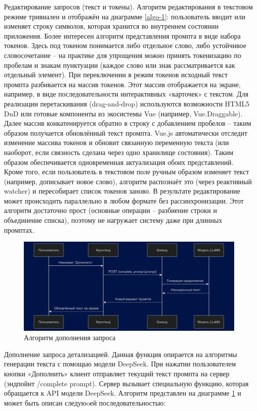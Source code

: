 Редактирование запросов (текст и токены). Алгоритм редактирования в текстовом режиме тривиален и отображён на диаграмме \ref{algo-1}: пользователь вводит или изменяет строку символов, которая хранится во внутреннем состоянии приложения. Более интересен алгоритм представления промпта в виде набора токенов. Здесь под токеном понимается либо отдельное слово, либо устойчивое словосочетание – на практике для упрощения можно принять токенизацию по пробелам и знакам пунктуации (каждое слово или знак рассматривается как отдельный элемент). При переключении в режим токенов исходный текст промпта разбивается на массив токенов. Этот массив отображается на экране, например, в виде последовательности интерактивных «карточек» с текстом. Для реализации перетаскивания (drag-and-drop) используются возможности HTML5 DnD или готовые компоненты из экосистемы Vue (например, Vue.Draggable). Далее массив конкатенируется обратно в строку с добавлением пробелов – таким образом получается обновлённый текст промпта. Vue.js автоматически отследит изменение массива токенов и обновит связанную переменную текста (или наоборот, если связность сделана через одно хранилище состояния). Таким образом обеспечивается одновременная актуализация обоих представлений. Кроме того, если пользователь в текстовом поле ручным образом изменяет текст (например, дописывает новое слово), алгоритм распознаёт это (через реактивный watcher) и пересобирает список токенов заново. В результате редактирование может происходить параллельно в любом формате без рассинхронизации. Этот алгоритм достаточно прост (основные операции – разбиение строки и объединение списка), поэтому не нагружает систему даже при длинных промптах.
\begin{figure}[htbp]
    \centering
    \includegraphics[width=1\textwidth]{picture/diploma-inter-algo-2.png}
    \caption{Алгоритм дополнения запроса}
    \label{algo-2}
\end{figure}
Дополнение запроса детализацией. Данная функция опирается на алгоритмы генерации текста с помощью модели DeepSeek. При нажатии пользователем кнопки «Дополнить» клиент отправляет текущий текст промпта на сервер (эндпойнт /complete prompt). Сервер вызывает специальную функцию, которая обращается к API модели DeepSeek. Алгоритм представлен на диаграмме \ref{algo-2} и может быть описан следуюoей последовательностью:
